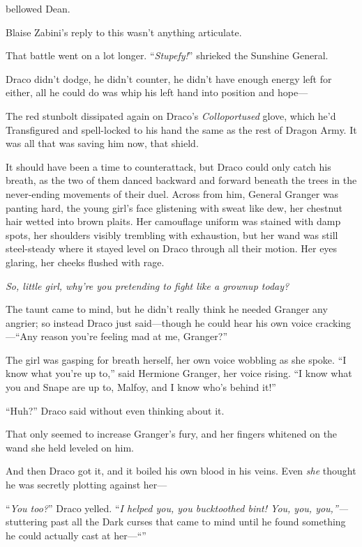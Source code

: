  bellowed Dean. 

Blaise Zabini’s reply to this wasn’t anything articulate.

That battle went on a lot longer.
\sbreak
“\emph{Stupefy!}” shrieked the Sunshine General.

Draco didn’t dodge, he didn’t counter, he didn’t have enough
energy left for either, all he could do was whip his left hand into
position and hope—

The red stunbolt dissipated again on Draco’s
\emph{Colloportused} glove, which he’d Transfigured and
spell-locked to his hand the same as the rest of Dragon Army. It
was all that was saving him now, that shield.

It should have been a time to counterattack, but Draco could
only catch his breath, as the two of them danced backward and
forward beneath the trees in the never-ending movements of their
duel. Across from him, General Granger was panting hard, the young
girl’s face glistening with sweat like dew, her chestnut hair
wetted into brown plaits. Her camouflage uniform was stained with
damp spots, her shoulders visibly trembling with exhaustion, but
her wand was still steel-steady where it stayed level on Draco
through all their motion. Her eyes glaring, her cheeks flushed with
rage.

\emph{So, little girl, why’re you pretending to fight like a
grownup today?}

The taunt came to mind, but he didn’t really think he needed
Granger any angrier; so instead Draco just said—though he could
hear his own voice cracking—“Any reason you’re feeling mad at me,
Granger?”

The girl was gasping for breath herself, her own voice wobbling
as she spoke. “I know what you’re up to,” said Hermione Granger,
her voice rising. “I know what you and Snape are up to, Malfoy, and
I know who’s behind it!”

“Huh?” Draco said without even thinking about it.

That only seemed to increase Granger’s fury, and her fingers
whitened on the wand she held leveled on him.

And then Draco got it, and it boiled his own blood in his veins.
Even \emph{she} thought he was secretly plotting against her—

“\emph{You too?}” Draco yelled. “\emph{I helped you, you
bucktoothed bint! You, you, you,”—} stuttering past all the
Dark curses that came to mind until he found something he could
actually cast at her—“”

